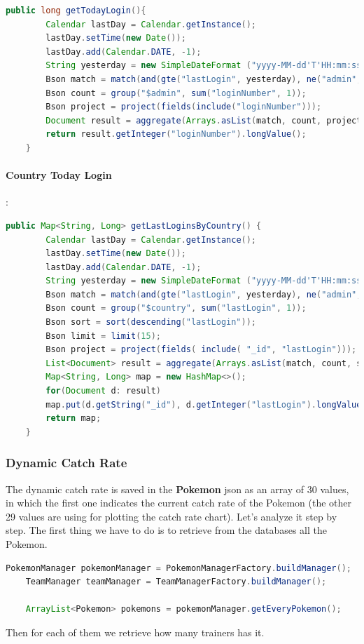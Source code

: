 \begin{lstlisting}[language=Java]
	public long getTodayLogin(){
		Calendar lastDay = Calendar.getInstance();
		lastDay.setTime(new Date());
		lastDay.add(Calendar.DATE, -1);
		String yesterday = new SimpleDateFormat ("yyyy-MM-dd'T'HH:mm:ss.SSS'Z'", Locale.US).format(lastDay.getTime());
		Bson match = match(and(gte("lastLogin", yesterday), ne("admin", true)));
		Bson count = group("$admin", sum("loginNumber", 1));
		Bson project = project(fields(include("loginNumber")));
		Document result = aggregate(Arrays.asList(match, count, project)).get(0);
		return result.getInteger("loginNumber").longValue();
	}
\end{lstlisting}

\paragraph{Country Today Login}:
\begin{lstlisting}[language=Java]
	public Map<String, Long> getLastLoginsByCountry() {
		Calendar lastDay = Calendar.getInstance();
		lastDay.setTime(new Date());
		lastDay.add(Calendar.DATE, -1);
		String yesterday = new SimpleDateFormat ("yyyy-MM-dd'T'HH:mm:ss.SSS'Z'", Locale.US).format(lastDay.getTime());
		Bson match = match(and(gte("lastLogin", yesterday), ne("admin", true)));
		Bson count = group("$country", sum("lastLogin", 1));
		Bson sort = sort(descending("lastLogin"));
		Bson limit = limit(15);
		Bson project = project(fields( include( "_id", "lastLogin")));
		List<Document> result = aggregate(Arrays.asList(match, count, sort, limit, project));
		Map<String, Long> map = new HashMap<>();
		for(Document d: result)
		map.put(d.getString("_id"), d.getInteger("lastLogin").longValue());
		return map;
	}
\end{lstlisting}



\subsubsection{Dynamic Catch Rate}
The dynamic catch rate is saved in the \textbf{Pokemon} json as an array of 30 values, in which the first one indicates the current catch rate of the Pokemon (the other 29 values are using for plotting the catch rate chart). Let’s analyze it step by step.
The first thing we have to do is to retrieve from the databases all the Pokemon.


\begin{lstlisting}[language=Java]
	PokemonManager pokemonManager = PokemonManagerFactory.buildManager();
	TeamManager teamManager = TeamManagerFactory.buildManager();
	
	ArrayList<Pokemon> pokemons = pokemonManager.getEveryPokemon();
\end{lstlisting}
Then for each of them we retrieve how many trainers has it.

